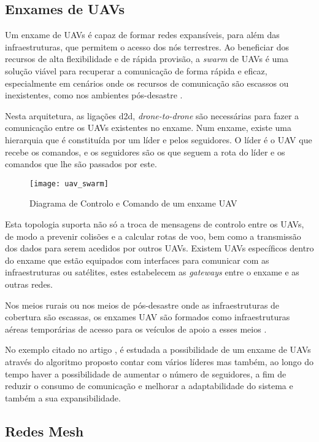 \subsection{Enxames de UAVs}

Um enxame de UAVs é capaz de formar redes expansíveis, para além das infraestruturas, que permitem o acesso dos nós terrestres. Ao beneficiar dos recursos de alta flexibilidade e de rápida provisão, a \textit{swarm} de UAVs é uma solução viável para recuperar a comunicação de forma rápida e eficaz, especialmente em cenários onde os recursos de comunicação são escassos ou inexistentes, como nos ambientes pós-desastre \cite{Shi2018}. 

Nesta arquitetura, as ligações d2d, \textit{drone-to-drone} são necessárias para fazer a comunicação entre os UAVs existentes no enxame. Num enxame, existe uma hierarquia que é constituída por um líder e pelos seguidores. O líder é o UAV que recebe os comandos, e os seguidores são os que seguem a rota do líder e os comandos que lhe são passados por este.

\begin{figure}[H]
\centering
\texttt{[image: uav\_swarm]}
\caption{Diagrama de Controlo e Comando de um enxame UAV\label{fig:uav_swarm} }\cite{G.Madey2013}
\end{figure}

Esta topologia suporta não só a troca de mensagens de controlo entre os UAVs, de modo a prevenir colisões e a calcular rotas de voo,  bem como a transmissão dos dados para serem acedidos por outros UAVs. Existem UAVs específicos dentro do enxame que estão equipados com interfaces para comunicar com as infraestruturas ou satélites, estes estabelecem as \textit{gateways} entre o enxame e as outras redes.

Nos meios rurais ou nos meios de pós-desastre onde as infraestruturas de cobertura são escassas, os enxames UAV são formados como infraestruturas aéreas temporárias de acesso para os veículos de apoio a esses meios \cite{Shi2018}.

No exemplo citado no artigo \cite{He2018}, é estudada a possibilidade de um enxame de UAVs através do algoritmo proposto contar com vários líderes mas também, ao longo do tempo haver a possibilidade de aumentar o número de seguidores, a fim de reduzir o consumo de comunicação e melhorar a adaptabilidade do sistema e também a sua expansibilidade.

\subsection{Redes Mesh}


